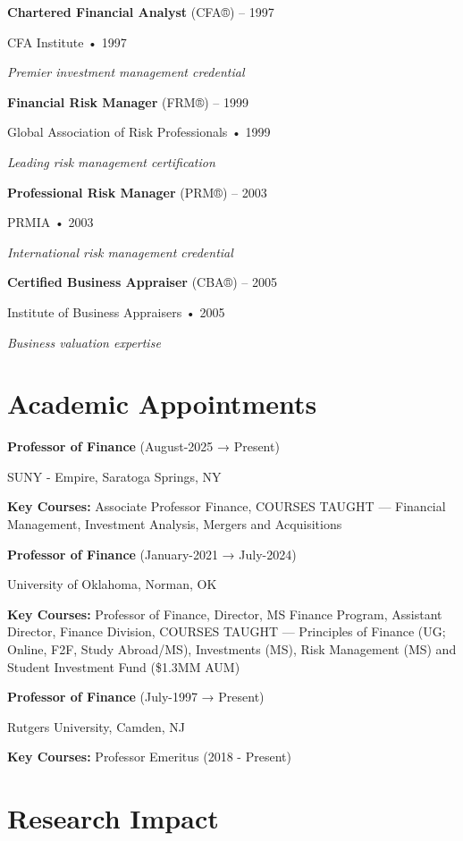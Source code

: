 \documentclass[11pt,a4paper,]{awesome-cv}
\let\oldtextbf\textbf
\renewcommand{\textbf}[1]{\oldtextbf{#1}\vspace{-1mm}}
\begin{document}
\textbf{Chartered Financial Analyst} (CFA®) -- 1997

CFA Institute • 1997

\textit{Premier investment management credential}

\textbf{Financial Risk Manager} (FRM®) -- 1999

Global Association of Risk Professionals • 1999

\textit{Leading risk management certification}

\textbf{Professional Risk Manager} (PRM®) -- 2003

PRMIA • 2003

\textit{International risk management credential}

\textbf{Certified Business Appraiser} (CBA®) -- 2005

Institute of Business Appraisers • 2005

\textit{Business valuation expertise}

\section{Academic Appointments}\label{academic-appointments}

\textbf{Professor of Finance} (August-2025 → Present)

SUNY - Empire, Saratoga Springs, NY

\textbf{Key Courses:} Associate Professor Finance, COURSES TAUGHT ---
Financial Management, Investment Analysis, Mergers and Acquisitions

\textbf{Professor of Finance} (January-2021 → July-2024)

University of Oklahoma, Norman, OK

\textbf{Key Courses:} Professor of Finance, Director, MS Finance
Program, Assistant Director, Finance Division, COURSES TAUGHT ---
Principles of Finance (UG; Online, F2F, Study Abroad/MS), Investments
(MS), Risk Management (MS) and Student Investment Fund (\$1.3MM AUM)

\textbf{Professor of Finance} (July-1997 → Present)

Rutgers University, Camden, NJ

\textbf{Key Courses:} Professor Emeritus (2018 - Present)

\section{Research Impact}\label{research-impact}
\end{document}
